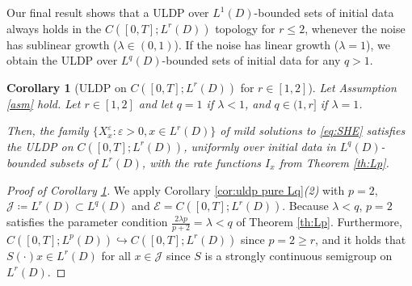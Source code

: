 \documentclass{amsart}
\theoremstyle{plain}
\theoremstyle{remark}
\theoremstyle{plain}
\newtheorem{corollary}[theorem]{Corollary}
\numberwithin{equation}{section}
\newcommand{\ceqq}{\coloneqq}
\newcommand{\eps}{\varepsilon}
\newcommand{\into}{\hookrightarrow}
\begin{document}
Our final result shows that a ULDP over $L^1(D)$-bounded sets of initial data always holds  in the  $C([0,T];L^r(D))$ topology for $r\leq 2$, whenever the noise has sublinear growth ($\lambda\in(0,1)$). If the noise has linear growth ($\lambda=1$), we obtain the ULDP over $L^q(D)$-bounded sets of initial data for any $q>1$. 

\begin{corollary}[{ULDP on $C([0,T];L^r(D))$ for $r\in[1,2]$}]\label{cor:Lp p<2}  
Let Assumption \ref{asm} hold. Let $r\in[1,2]$ and let $q=1$ if $\lambda<1$, and $q\in(1,r]$ if $\lambda=1$.   

Then, the family $\{X_x^{\eps}:\eps>0,x\in L^r(D)\}$ of mild solutions to \eqref{eq:SHE}  satisfies the ULDP on $C([0,T];L^r(D))$, uniformly over initial data in $L^q(D)$-bounded subsets of $L^r(D)$,  
with the rate functions $I_x$ from Theorem \ref{th:Lp}. 
\end{corollary} 
\begin{proof}[Proof of Corollary \ref{cor:Lp p<2}]
We apply Corollary \ref{cor:uldp pure Lq}\textit{(2)} with $p=2$, $\mathcal{J}\ceqq L^r(D)\subset L^q(D)$  and $\mathcal{E}=C([0,T];L^r(D))$. 
    Because $\lambda<q$, $p=2$ satisfies the parameter condition $\frac{2\lambda  p}{ p+2}=\lambda< q$  of Theorem \ref{th:Lp}. Furthermore, $C([0,T];L^p(D))\into C([0,T];L^r(D))$ since $p=2\geq r$, and it holds that $S(\cdot)x\in L^r(D)$ for all $x\in \mathcal{J}$ since $S$ is a strongly continuous semigroup on $L^r(D)$.  
\end{proof}




\end{document}
